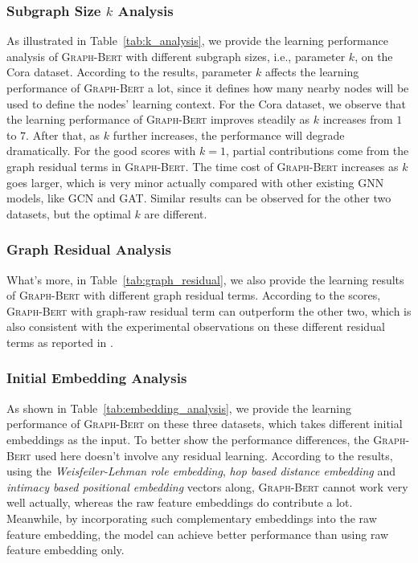 \documentclass{article}
\newcommand{\our}{\textsc{Graph-Bert}}
\newcommand{\gcn}{\textsc{GCN}}
\newcommand{\gat}{\textsc{GAT}}
\begin{document}
\subsubsection{Subgraph Size $k$ Analysis}

As illustrated in Table~\ref{tab:k_analysis}, we provide the learning performance analysis of {\our} with different subgraph sizes, i.e., parameter $k$, on the Cora dataset. According to the results, parameter $k$ affects the learning performance of {\our} a lot, since it defines how many nearby nodes will be used to define the nodes' learning context. For the Cora dataset, we observe that the learning performance of {\our} improves steadily as $k$ increases from $1$ to $7$. After that, as $k$ further increases, the performance will degrade dramatically. For the good scores with $k=1$, partial contributions come from the graph residual terms in {\our}. The time cost of {\our} increases as $k$ goes larger, which is very minor actually compared with other existing GNN models, like {\gcn} and {\gat}. Similar results can be observed for the other two datasets, but the optimal $k$ are different.


\subsubsection{Graph Residual Analysis}

What's more, in Table~\ref{tab:graph_residual}, we also provide the learning results of {\our} with different graph residual terms. According to the scores, {\our} with graph-raw residual term can outperform the other two, which is also consistent with the experimental observations on these different residual terms as reported in \cite{Zhang2019GResNetGR}.

\subsubsection{Initial Embedding Analysis}

As shown in Table~\ref{tab:embedding_analysis}, we provide the learning performance of {\our} on these three datasets, which takes different initial embeddings as the input. To better show the performance differences, the {\our} used here doesn't involve any residual learning. According to the results, using the \textit{Weisfeiler-Lehman role embedding}, \textit{hop based distance embedding} and \textit{intimacy based positional embedding} vectors along, {\our} cannot work very well actually, whereas the raw feature embeddings do contribute a lot. Meanwhile, by incorporating such complementary embeddings into the raw feature embedding, the model can achieve better performance than using raw feature embedding only.
\end{document}
